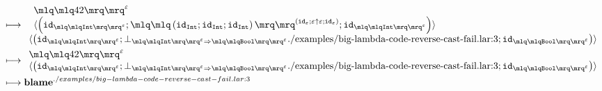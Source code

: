 \documentclass{article}
\begin{document}
\begin{align*}
\longmapsto &\;\begin{array}{l}\begin{array}{l}\quot{42}^{\varepsilon}\\\langle\left(\mathtt{id}_{\quot{\mathtt{Int}}^{\varepsilon}};\quot{\left(\mathtt{id}_{\mathtt{Int}};\mathtt{id}_{\mathtt{Int}};\mathtt{id}_{\mathtt{Int}}\right)}^{\left(\mathtt{id}_{\varepsilon};\varepsilon \uparrow \varepsilon;\mathtt{id}_{\varepsilon}\right)};\mathtt{id}_{\quot{\mathtt{Int}}^{\varepsilon}}\right)\rangle\end{array}\\\langle\left(\mathtt{id}_{\quot{\mathtt{Int}}^{\varepsilon}};\bot_{\quot{\mathtt{Int}}^{\varepsilon}\Rightarrow\quot{\mathtt{Bool}}^{\varepsilon}}\text{./examples/big-lambda-code-reverse-cast-fail.lar:3};\mathtt{id}_{\quot{\mathtt{Bool}}^{\varepsilon}}\right)\rangle\end{array}\\ 
\longmapsto &\;\begin{array}{l}\quot{42}^{\varepsilon}\\\langle\left(\mathtt{id}_{\quot{\mathtt{Int}}^{\varepsilon}};\bot_{\quot{\mathtt{Int}}^{\varepsilon}\Rightarrow\quot{\mathtt{Bool}}^{\varepsilon}}\text{./examples/big-lambda-code-reverse-cast-fail.lar:3};\mathtt{id}_{\quot{\mathtt{Bool}}^{\varepsilon}}\right)\rangle\end{array}\\ 
\longmapsto &\;\mathbf{blame}^{./examples/big-lambda-code-reverse-cast-fail.lar:3}\end{align*}
\end{document}
